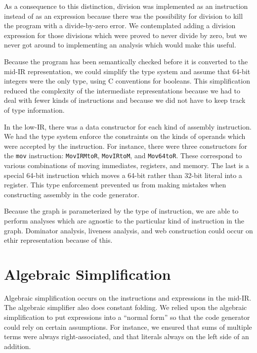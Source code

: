 \documentclass[11pt]{article}
\begin{document}
As a consequence to this distinction, division was implemented as an
instruction instead of as an expression because there was the
possibility for division to kill the program with a divide-by-zero
error.  We contemplated adding a division expression for those
divisions which were proved to never divide by zero, but we never got
around to implementing an analysis which would make this useful.

Because the program has been semantically checked before it is
converted to the mid-IR representation, we could simplify the type
system and assume that 64-bit integers were the only type, using C
conventions for booleans.  This simplification reduced the complexity
of the intermediate representations because we had to deal with fewer
kinds of instructions and because we did not have to keep track of
type information.

In the low-IR, there was a data constructor for each kind of assembly
instruction.  We had the type system enforce the constraints on the
kinds of operands which were accepted by the instruction.  For
instance, there were three constructors for the \texttt{mov}
instruction: \texttt{MovIRMtoR}, \texttt{MovIRtoM}, and
\texttt{Mov64toR}.  These correspond to various combinations of moving
immediates, registers, and memory.  The last is a special 64-bit
instruction which moves a 64-bit rather than 32-bit literal into a
register.  This type enforcement prevented us from making mistakes
when constructing assembly in the code generator.

Because the graph is parameterized by the type of instruction, we are
able to perform analyses which are agnostic to the particular kind of
instruction in the graph.  Dominator analysis, liveness analysis, and
web construction could occur on ethir representation because of this.

\section {Algebraic Simplification} 
\label{sec:algebra}

Algebraic simplification occurs on the instructions and expressions in
the mid-IR.  The algebraic simplifier also does constant folding.  We
relied upon the algebraic simplification to put expressions into a
``normal form'' so that the code generator could rely on certain
assumptions.  For instance, we ensured that sums of multiple terms
were always right-associated, and that literals always on the left
side of an addition.
\end{document}
